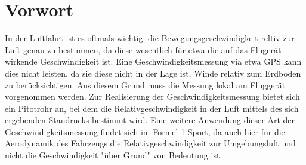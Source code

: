 \section{Vorwort}
In der Luftfahrt ist es oftmals wichtig. die Bewegungsgeschwindigkeit reltiv zur Luft genau zu bestimmen, da diese wesentlich 
für etwa die auf das Flugerät wirkende Geschwindigkeit ist. Eine Geschwindigkeitsmessung via etwa GPS kann dies nicht leisten, 
da sie diese nicht in der Lage ist, Winde relativ zum Erdboden zu berücksichtigen. Aus diesem Grund muss die Messung lokal am 
Fluggerät vorgenommen werden. Zur Realisierung der Geschwindigkeitsmessung bietet sich ein Pitotrohr an, bei dem die 
Relativgeschwindigkeit in der Luft mittels des sich ergebenden Staudrucks bestimmt wird. Eine weitere Anwendung dieser Art der 
Geschwindigkeitsmessung findet sich im Formel-1-Sport, da auch hier für die Aerodynamik des Fahrzeugs die Relativgeschwindigkeit 
zur Umgebungsluft und nicht die Geschwindigkeit "über Grund" von Bedeutung ist. \\
